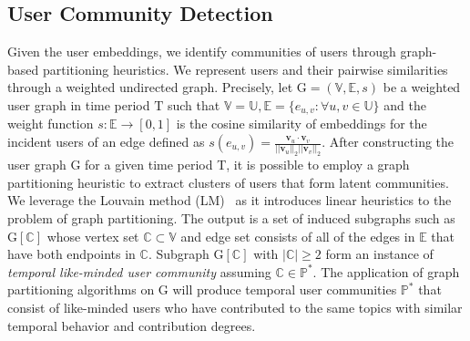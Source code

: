 \documentclass[sigconf]{acmart}
\begin{document}
\subsection{User Community Detection\label{community_detection}}
Given the user embeddings, we identify communities of users through graph-based partitioning heuristics. We represent users and their pairwise similarities through a weighted undirected graph. Precisely, let $\text{G}=(\mathbb{V},\mathbb{E}, s)$ be a weighted user graph in time period $\text{T}$ such that $\mathbb{V}=\mathbb{U},\mathbb{E}=\{e_{u,v}:\forall{u,v}\in\mathbb{U}\}$ and the weight function $s:\mathbb{E}\rightarrow[0,1]$ is the cosine similarity of embeddings for the incident users of an edge defined as $s(e_{u,v})=\frac{\textbf{v}_u\cdot{\textbf{v}_v}}{||\textbf{v}_u||_2||\textbf{v}_v||_2}$. After constructing the user graph G for a given time period T, it is possible to employ a graph partitioning heuristic to extract clusters of users that form latent communities. We leverage the Louvain method (LM)~\cite{1742-5468-2008-10-P10008} as it introduces linear heuristics to the problem of graph partitioning. The output is a set of induced subgraphs such as $\text{G}[\mathbb{C}]$ whose vertex set $\mathbb{C}\subset{\mathbb{V}}$ and edge set consists of all of the edges in $\mathbb{E}$ that have both endpoints in $\mathbb{C}$. Subgraph $\text{G}[\mathbb{C}]$ with $|\mathbb{C}|\geq2$ form an instance of \textit{temporal like-minded user community} assuming $\mathbb{C}\in\mathbb{P}^*$. The application of graph partitioning algorithms on G will produce temporal user communities $\mathbb{P}^*$ that consist of like-minded users who have contributed to the same topics with similar temporal behavior and contribution degrees.



\end{document}
